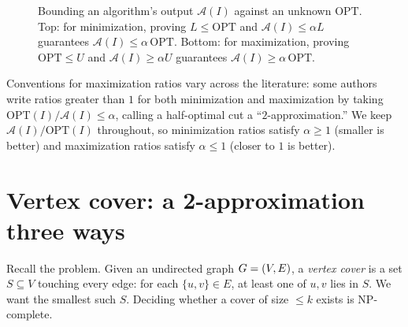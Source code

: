 \begin{figure}[htbp]
\caption{Bounding an algorithm's output $\mathcal{A}(I)$ against an unknown $\mathrm{OPT}$. Top: for minimization, proving $L \le \mathrm{OPT}$ and $\mathcal{A}(I) \le \alpha L$ guarantees $\mathcal{A}(I) \le \alpha\,\mathrm{OPT}$. Bottom: for maximization, proving $\mathrm{OPT} \le U$ and $\mathcal{A}(I) \ge \alpha U$ guarantees $\mathcal{A}(I) \ge \alpha\,\mathrm{OPT}$.}
\label{ch38:fig-sandwich}
\end{figure}

\begin{marginnotebox}
Conventions for maximization ratios vary across the literature: some authors write ratios greater than $1$ for both minimization and maximization by taking $\mathrm{OPT}(I)/\mathcal{A}(I) \le \alpha$, calling a half-optimal cut a ``$2$-approximation.'' We keep $\mathcal{A}(I)/\mathrm{OPT}(I)$ throughout, so minimization ratios satisfy $\alpha \ge 1$ (smaller is better) and maximization ratios satisfy $\alpha \le 1$ (closer to $1$ is better).
\end{marginnotebox}

\section{Vertex cover: a 2-approximation three ways}
\label{ch38:sec-vc}

Recall the problem. Given an undirected graph $G=(V,E)$, a \emph{vertex cover} is a set
$S\subseteq V$ touching every edge: for each $\{u,v\}\in E$, at least one of $u,v$ lies in $S$. We
want the smallest such $S$. Deciding whether a cover of size $\le k$ exists is \textsf{NP}-complete.

